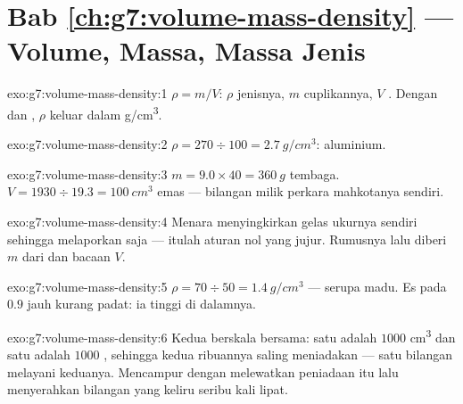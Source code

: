 \section*{Bab \ref{ch:g7:volume-mass-density} --- Volume, Massa, Massa Jenis}

\begin{solution}{exo:g7:volume-mass-density:1}
$\rho = m/V$: $\rho$  jenisnya, $m$  cuplikannya, $V$
. Dengan  dan , $\rho$ keluar dalam
\unit{g/cm^3}.
\end{solution}

\begin{solution}{exo:g7:volume-mass-density:2}
$\rho = 270 \div 100 = \qty{2.7}{g/cm^3}$: aluminium.
\end{solution}

\begin{solution}{exo:g7:volume-mass-density:3}
$m = 9.0 \times 40 = \qty{360}{g}$ tembaga.
$V = 1930 \div 19.3 = \qty{100}{cm^3}$ emas --- bilangan milik
perkara mahkotanya sendiri.
\end{solution}

\begin{solution}{exo:g7:volume-mass-density:4}
Menara menyingkirkan  gelas ukurnya sendiri sehingga 
melaporkan  saja --- itulah aturan nol yang jujur. Rumusnya
lalu diberi  $m$ dari  dan bacaan  $V$.
\end{solution}

\begin{solution}{exo:g7:volume-mass-density:5}
$\rho = 70 \div 50 = \qty{1.4}{g/cm^3}$ --- serupa madu. Es pada
$0.9$ jauh kurang padat: ia  tinggi di dalamnya.
\end{solution}

\begin{solution}{exo:g7:volume-mass-density:6}
Kedua  berskala bersama: satu  adalah $1000$
\unit{cm^3} dan satu  adalah $1000$ , sehingga kedua
ribuannya saling meniadakan --- satu bilangan melayani keduanya.
Mencampur  dengan  melewatkan peniadaan itu lalu menyerahkan
bilangan yang keliru seribu kali lipat.
\end{solution}

